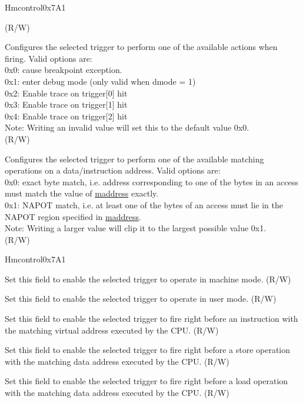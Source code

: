 \begin{register}{H}{mcontrol}{0x7A1}
\begin{regdesc}
\begin{reglist}
(R/W)
\label{fielddesc:MCONTROLACTION}\item [action] Configures the selected trigger to perform one of the available actions when firing. Valid options are:\\
0x0: cause breakpoint exception.\\
0x1: enter debug mode (only valid when dmode = 1)\\
0x2: Enable trace on trigger[0] hit\\
0x3: Enable trace on trigger[1] hit\\
0x4: Enable trace on trigger[2] hit\\
Note: Writing an invalid value will set this to the default value 0x0.\\
(R/W)
\label{fielddesc:MCONTROLMATCH}\item [match] Configures the selected trigger to perform one of the available matching operations on a data/instruction address. Valid options are:\\
0x0: exact byte match, i.e. address corresponding to one of the bytes in an access must match the value of \hyperref[regdesc:MADDRESS]{maddress} exactly.\\
0x1: NAPOT match, i.e. at least one of the bytes of an access must lie in the NAPOT region specified in \hyperref[regdesc:MADDRESS]{maddress}.\\
Note: Writing a larger value will clip it to the largest possible value 0x1.\\
(R/W)
\item [Continued on the next page...]
\end{reglist}\end{regdesc}
\end{register}
\addtocounter{Regfloat}{-1}
\begin{register}{H}{mcontrol}{0x7A1}
\begin{regdesc}\begin{reglist}
\item [Continued from the previous page...]
\label{fielddesc:MCONTROLM}\item [m] Set this field to enable the selected trigger to operate in machine mode. (R/W)
\label{fielddesc:MCONTROLU}\item [u] Set this field to enable the selected trigger to operate in user mode. (R/W)
\label{fielddesc:MCONTROLEXECUTE}\item [execute] Set this field to enable the selected trigger to fire right before an instruction with the matching virtual address executed by the CPU. (R/W)
\label{fielddesc:MCONTROLSTORE}\item [store] Set this field to enable the selected trigger to fire right before a store operation with the matching data address executed by the CPU. (R/W)
\label{fielddesc:MCONTROLLOAD}\item [load] Set this field to enable the selected trigger to fire right before a load operation with the matching data address executed by the CPU. (R/W)
\end{reglist}\end{regdesc}
\end{register}

